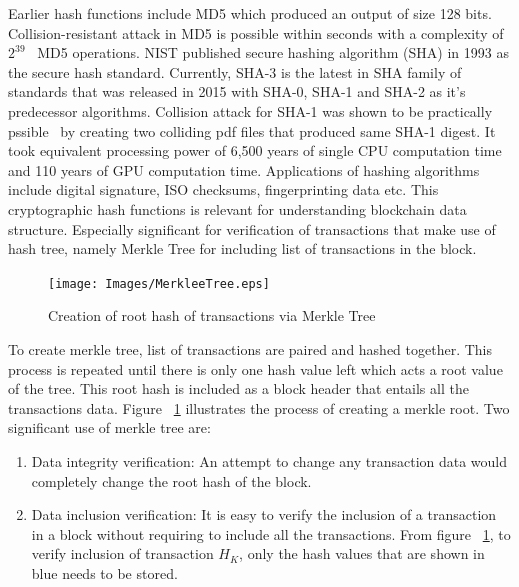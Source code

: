 Earlier hash functions include MD5 which produced an output of size 128 bits.
Collision-resistant attack in MD5 is possible within seconds with a complexity
of $2^{39}$~\cite{wang2005break} MD5 operations. NIST published secure hashing algorithm (SHA)
in 1993 as the secure hash standard. Currently, SHA-3 is the latest in SHA
family of standards that was released in 2015 with SHA-0, SHA-1 and SHA-2 as
it's predecessor algorithms. Collision attack for SHA-1 was shown to be
practically pssible~\cite{stevens2017first} by creating two colliding pdf files
that produced same SHA-1 digest. It took equivalent processing power of 6,500
years of single CPU computation time and 110 years of GPU computation time.
Applications of hashing algorithms include digital signature, ISO checksums,
fingerprinting data etc. This cryptographic hash functions is relevant for
understanding blockchain data structure. Especially significant for
verification of transactions that make use of hash tree, namely Merkle Tree for
including list of transactions in the block.
\begin{figure}
	\begin{center}
		\texttt{[image: Images/MerkleeTree.eps]}
		\caption{Creation of root hash of transactions via Merkle Tree}
		\label{fig:merkleTree}
	\end{center}
\end{figure}
To create merkle tree, list of transactions are paired and hashed together.
This process is repeated until there is only one hash value left which acts a
root value of the tree. This root hash is included as a block header that
entails all the transactions data. Figure ~\ref{fig:merkleTree} illustrates the
process of creating a merkle root. 
Two significant use of merkle tree are: 
\begin{enumerate}
	\item Data integrity verification: An attempt to change any transaction data
		would completely change the root hash of the block.  
	\item Data inclusion verification: It is easy to verify the inclusion of a
		transaction in a block without requiring to include all the
		transactions. From figure ~\ref{fig:merkleTree}, to verify inclusion of
		transaction $H_{K}$, only the hash values that are shown in blue needs
		to be stored.
\end{enumerate}




